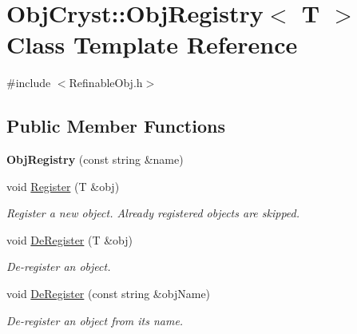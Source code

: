 \hypertarget{class_obj_cryst_1_1_obj_registry}{}\section{Obj\+Cryst\+::Obj\+Registry$<$ T $>$ Class Template Reference}
\label{class_obj_cryst_1_1_obj_registry}


{\ttfamily \#include $<$Refinable\+Obj.\+h$>$}

\subsection*{Public Member Functions}
\begin{DoxyCompactItemize}
\item 
\mbox{\label{class_obj_cryst_1_1_obj_registry_a5c31340787c7d1c91c64e201a06a9c4d}} 
{\bfseries Obj\+Registry} (const string \&name)
\item 
\mbox{\label{class_obj_cryst_1_1_obj_registry_aa5f3f9586f5fbbedd804d0e730c66c71}} 
void \mbox{\hyperlink{class_obj_cryst_1_1_obj_registry_aa5f3f9586f5fbbedd804d0e730c66c71}{Register}} (T \&obj)
\begin{DoxyCompactList}\small\item\em Register a new object. Already registered objects are skipped. \end{DoxyCompactList}\item 
\mbox{\label{class_obj_cryst_1_1_obj_registry_a31d6f5073615294d6b0f68759f1895c9}} 
void \mbox{\hyperlink{class_obj_cryst_1_1_obj_registry_a31d6f5073615294d6b0f68759f1895c9}{De\+Register}} (T \&obj)
\begin{DoxyCompactList}\small\item\em De-\/register an object. \end{DoxyCompactList}\item 
\mbox{\label{class_obj_cryst_1_1_obj_registry_a33fc97d104af353a8a3c82ad82237b65}} 
void \mbox{\hyperlink{class_obj_cryst_1_1_obj_registry_a33fc97d104af353a8a3c82ad82237b65}{De\+Register}} (const string \&obj\+Name)
\begin{DoxyCompactList}\small\item\em De-\/register an object from its name. \end{DoxyCompactList}\item 

\end{DoxyCompactItemize}
